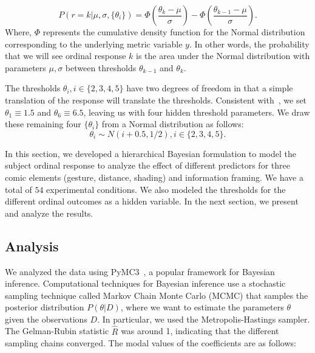 \begin{equation}
 P(r=k | \mu, \sigma, \{\theta_i\}) = \Phi \left (\frac{\theta_k - \mu}{\sigma} \right) - \Phi \left(\frac{\theta_{k-1} - \mu}{\sigma} \right).
\end{equation}
Where, $\Phi$ represents the cumulative density function for the Normal distribution corresponding to the underlying metric variable $y$. In other words, the probability that we will see ordinal response $k$ is the area under the Normal distribution with parameters $\mu, \sigma$ between thresholds $\theta_{k-1}$ and $\theta_k$.

The thresholds $\theta_i, i \in \{2, 3, 4, 5\}$ have two degrees of freedom in that a simple translation of the response will translate the thresholds. Consistent with~\textcite[][p. 674]{Kruschke2014}, we set $\theta_1\equiv1.5$ and $\theta_6\equiv6.5$, leaving us with four hidden threshold parameters. We draw these remaining four $\{ \theta_i\}$ from a Normal distribution as follows:
\begin{equation}
 \theta_i \sim N(i+0.5, 1/2), i \in \{2, 3, 4, 5\}.
\end{equation}

In this section, we developed a hierarchical Bayesian formulation to model the subject ordinal response to analyze the effect of different predictors for three comic elements (gesture, distance, shading) and information framing. We have a total of $54$ experimental conditions. We also modeled the thresholds for the different ordinal outcomes as a hidden variable. In the next section, we present and analyze the results.

\subsection{Analysis}
\label{sub:Analysis}

We analyzed the data using PyMC3~\cite{Salvatier2016}, a popular framework for Bayesian inference. Computational techniques for Bayesian inference use a stochastic sampling technique called Markov Chain Monte Carlo (MCMC) that samples the posterior distribution $P(\theta | D)$, where we want to estimate the parameters $\theta$ given the observations $D$. In particular, we used the Metropolis-Hastings sampler. The Gelman-Rubin statistic $\hat{R}$ was around 1, indicating that the different sampling chains converged. The modal values of the coefficients are as follows:

